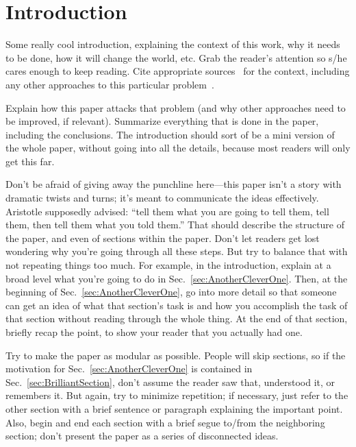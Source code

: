 \documentclass[reprint, aps, prd, letterpaper, noshowpacs, amsmath, %
amssymb, amsfonts, nofootinbib, floatfix, superscriptaddress, %
twoside]{revtex4-1}
\begin{document}
\section{Introduction}
\label{sec:Introduction}

Some really cool introduction, explaining the context of this work,
why it needs to be done, how it will change the world, etc.  Grab the
reader's attention so s/he cares enough to keep reading.  Cite
appropriate sources~\cite{MTW, Wald:1984} for the context, including
any other approaches to this particular
problem~\cite{doranlasenby:2003}.

Explain how this paper attacks that problem (and why other approaches
need to be improved, if relevant).  Summarize everything that is done
in the paper, including the conclusions.  The introduction should sort
of be a mini version of the whole paper, without going into all the
details, because most readers will only get this far.

Don't be afraid of giving away the punchline here---this paper isn't a
story with dramatic twists and turns; it's meant to communicate the
ideas effectively.  Aristotle supposedly advised: ``tell them what you
are going to tell them, tell them, then tell them what you told
them.''  That should describe the structure of the paper, and even of
sections within the paper.  Don't let readers get lost wondering why
you're going through all these steps.  But try to balance that with
not repeating things too much.  For example, in the introduction,
explain at a broad level what you're going to do in
Sec.~\ref{sec:AnotherCleverOne}.  Then, at the beginning of
Sec.~\ref{sec:AnotherCleverOne}, go into more detail so that someone
can get an idea of what that section's task is and how you accomplish
the task of that section without reading through the whole thing.  At
the end of that section, briefly recap the point, to show your reader
that you actually had one.

Try to make the paper as modular as possible.  People will skip
sections, so if the motivation for Sec.~\ref{sec:AnotherCleverOne} is
contained in Sec.~\ref{sec:BrilliantSection}, don't assume the reader
saw that, understood it, or remembers it.  But again, try to minimize
repetition; if necessary, just refer to the other section with a brief
sentence or paragraph explaining the important point.  Also, begin and
end each section with a brief segue to/from the neighboring section;
don't present the paper as a series of disconnected ideas.
\end{document}
